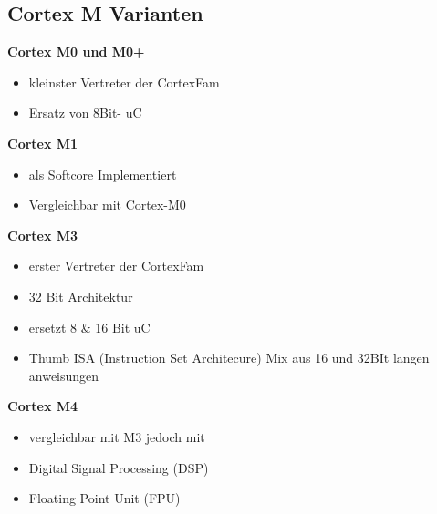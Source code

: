 \subsection{Cortex M Varianten}
\begin{multicols}{2}
\textbf{Cortex M0 und M0+}
    \begin{itemize}
        \item kleinster Vertreter der CortexFam
        \item Ersatz von 8Bit- uC
        \end{itemize}                     
 \textbf{Cortex M1}
    \begin{itemize}
        \item als Softcore Implementiert
        \item Vergleichbar mit Cortex-M0
    \end{itemize}
\end{multicols}
\begin{multicols}{2}
   \textbf{Cortex M3}     
     \begin{itemize}
         \item erster Vertreter der CortexFam
         \item 32 Bit Architektur
         \item ersetzt 8 \& 16 Bit uC
         \item Thumb ISA (Instruction Set Architecure)\newline
         Mix aus 16 und 32BIt langen anweisungen
     \end{itemize}   
               
   \textbf{Cortex M4} 
    \begin{itemize}
        \item vergleichbar mit M3 jedoch mit
        \qquad\item Digital Signal Processing (DSP)
        \qquad\item Floating Point Unit (FPU)
        \newline
      \end{itemize}  
\end{multicols}
\clearpage
